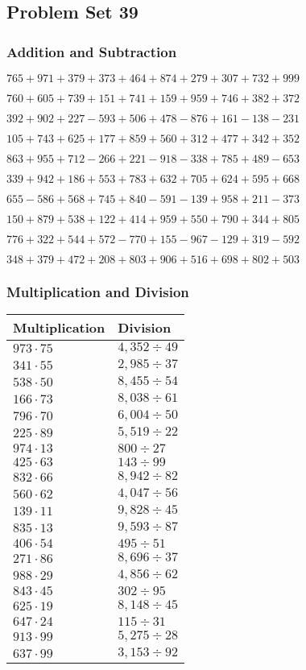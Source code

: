 \hypertarget{problem-set-39-2}{%
\subsection{Problem Set 39}\label{problem-set-39-2}}

\hypertarget{addition-and-subtraction-139}{%
\subsubsection{Addition and
Subtraction}\label{addition-and-subtraction-139}}

\(765 + 971 + 379 + 373 + 464 + 874 + 279 + 307 + 732 + 999\)

\(760 + 605 + 739 + 151 + 741 + 159 + 959 + 746 + 382 + 372\)

\(392 + 902 + 227 - 593 + 506 + 478 - 876 + 161 - 138 - 231\)

\(105 + 743 + 625 + 177 + 859 + 560 + 312 + 477 + 342 + 352\)

\(863 + 955 + 712 - 266 + 221 - 918 - 338 + 785 + 489 - 653\)

\(339 + 942 + 186 + 553 + 783 + 632 + 705 + 624 + 595 + 668\)

\(655 - 586 + 568 + 745 + 840 - 591 - 139 + 958 + 211 - 373\)

\(150 + 879 + 538 + 122 + 414 + 959 + 550 + 790 + 344 + 805\)

\(776 + 322 + 544 + 572 - 770 + 155 - 967 - 129 + 319 - 592\)

\(348 + 379 + 472 + 208 + 803 + 906 + 516 + 698 + 802 + 503\)

\hypertarget{multiplication-and-division-139}{%
\subsubsection{Multiplication and
Division}\label{multiplication-and-division-139}}

\begin{longtable}[]{@{}ll@{}}
\toprule
Multiplication & Division\tabularnewline
\midrule
\endhead
\(973 \cdot 75\) & \(4,352÷49\)\tabularnewline
\(341 \cdot 55\) & \(2,985÷37\)\tabularnewline
\(538 \cdot 50\) & \(8,455÷54\)\tabularnewline
\(166 \cdot 73\) & \(8,038÷61\)\tabularnewline
\(796 \cdot 70\) & \(6,004÷50\)\tabularnewline
\(225 \cdot 89\) & \(5,519÷22\)\tabularnewline
\(974 \cdot 13\) & \(800÷27\)\tabularnewline
\(425 \cdot 63\) & \(143÷99\)\tabularnewline
\(832 \cdot 66\) & \(8,942÷82\)\tabularnewline
\(560 \cdot 62\) & \(4,047÷56\)\tabularnewline
\(139 \cdot 11\) & \(9,828÷45\)\tabularnewline
\(835 \cdot 13\) & \(9,593÷87\)\tabularnewline
\(406 \cdot 54\) & \(495÷51\)\tabularnewline
\(271 \cdot 86\) & \(8,696÷37\)\tabularnewline
\(988 \cdot 29\) & \(4,856÷62\)\tabularnewline
\(843 \cdot 45\) & \(302÷95\)\tabularnewline
\(625 \cdot 19\) & \(8,148÷45\)\tabularnewline
\(647 \cdot 24\) & \(115÷31\)\tabularnewline
\(913 \cdot 99\) & \(5,275÷28\)\tabularnewline
\(637 \cdot 99\) & \(3,153÷92\)\tabularnewline
\bottomrule
\end{longtable}

